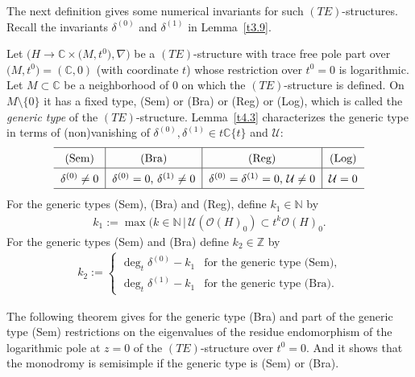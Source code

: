 \documentclass[10pt,a4paper]{amsart}
\numberwithin{equation}{section}
\numberwithin{figure}{section}
\newcommand{\N}{{\mathbb N}}
\newcommand{\Z}{{\mathbb Z}}
\newcommand{\C}{{\mathbb C}}
\newcommand{\OO}{{\mathcal O}}
\newcommand{\UU}{{\mathcal U}}
\newcommand{\nnn}{\nabla}
\begin{document}
The next definition gives some numerical invariants
for such $(TE)$-structures.
Recall the invariants $\delta^{(0)}$ and $\delta^{(1)}$
in Lemma~\ref{t3.9}.


\begin{Definition}\label{t6.1}
Let $\big(H\to\C\times \big(M,t^0\big),\nnn\big)$ be a $(TE)$-structure
with trace free pole part over $\big(M,t^0\big)=(\C,0)$
(with coordinate $t$) whose restriction over $t^0=0$ is
logarithmic. Let $M\subset \C$ be a neighborhood of 0
on which the $(TE)$-structure is defined.
On $M\setminus\{0\}$ it has a fixed type, (Sem) or (Bra) or
(Reg) or (Log), which is called the {\it generic type}
of the $(TE)$-structure. Lemma~\ref{t4.3} characterizes
the generic type in terms of (non)vanishing of
$\delta^{(0)},\delta^{(1)}\in t\C\{t\}$ and $\UU$:
\[
\def\arraystretch{1.5}
\begin{tabular}{c|c|c|c}
\hline
(Sem) &(Bra) &(Reg) &(Log)
\\ \hline
$\delta^{(0)}\neq 0$ & $\delta^{(0)}=0$,\ $\delta^{(1)}\neq 0$ &
$\delta^{(0)}=\delta^{(1)}=0$, $\UU\neq 0$ & $\UU=0$
\\
\hline
\end{tabular}
\]
For the generic types (Sem), (Bra) and (Reg), define
$k_1\in\N$ by
\begin{eqnarray}\label{6.1}
k_1 :=\max(k\in\N\,|\, \UU(\OO(H)_0)\subset t^k\OO(H)_0.
\end{eqnarray}
For the generic types (Sem) and (Bra) define $k_2\in\Z$ by
\begin{gather*}%
k_2:= \begin{cases}
\deg_t\delta^{(0)}-k_1 & \text{for the generic type (Sem)},\\
\deg_t\delta^{(1)}-k_1 & \text{for the generic type (Bra)}.
\end{cases}
\end{gather*}
\end{Definition}

The following theorem gives for the generic type (Bra) and
part of the generic type (Sem) restrictions on the eigenvalues
of the residue endomorphism of the logarithmic pole at $z=0$
of the $(TE)$-structure over $t^0=0$.
And it shows that the monodromy is semisimple if the generic
type is (Sem) or (Bra).
\end{document}
